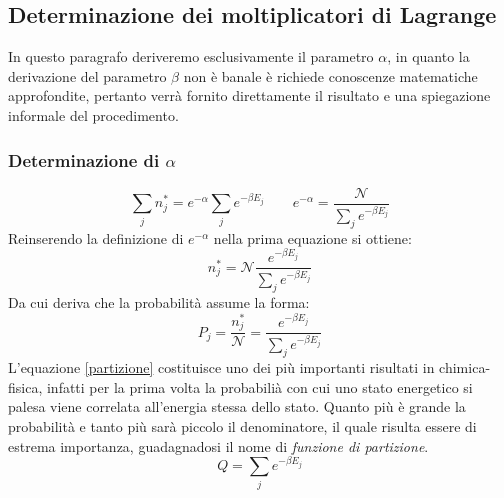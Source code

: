 \documentclass[oneside]{amsbook}
\numberwithin{section}{chapter}
\numberwithin{equation}{section}
\numberwithin{figure}{section}
\begin{document}
\subsection{Determinazione dei moltiplicatori di Lagrange}
In questo paragrafo deriveremo esclusivamente il parametro $\alpha$, in quanto la derivazione del parametro $\beta$ non è banale è richiede conoscenze matematiche approfondite, pertanto verrà fornito direttamente il risultato e una spiegazione informale del procedimento.
\subsubsection{Determinazione di $\alpha$}
\begin{equation}
\sum_j n_j^* = e ^{-\alpha} \sum_j e^{-\beta E_j} \quad \quad  e ^{-\alpha} =\frac{\mathcal{N}}{\sum_j e^{-\beta E_j}}
\end{equation}
Reinserendo la definizione di $e ^{-\alpha}$ nella prima equazione si ottiene:
\begin{equation}
 n_j^* = \mathcal{N}\frac{ e^{-\beta E_j}}{\sum_j e^{-\beta E_j}} 
\end{equation}
Da cui deriva che la probabilità assume la forma:
\begin{equation}
\label{partizione}
P_j= \frac{ n_j^*}{\mathcal{N}} = \frac{ e^{-\beta E_j}}{\sum_j e^{-\beta E_j}} 
\end{equation}
L'equazione \ref{partizione} costituisce uno dei più importanti risultati in chimica-fisica, infatti per la prima volta la probabilià con cui uno stato energetico si palesa viene correlata all'energia stessa dello stato. Quanto più è grande la probabilità e tanto più sarà piccolo il denominatore, il quale risulta essere di estrema importanza, guadagnadosi il nome di \emph{funzione di partizione}. 
\begin{equation}
Q=\sum_j e^{-\beta E_j}
\end{equation}
\end{document}
